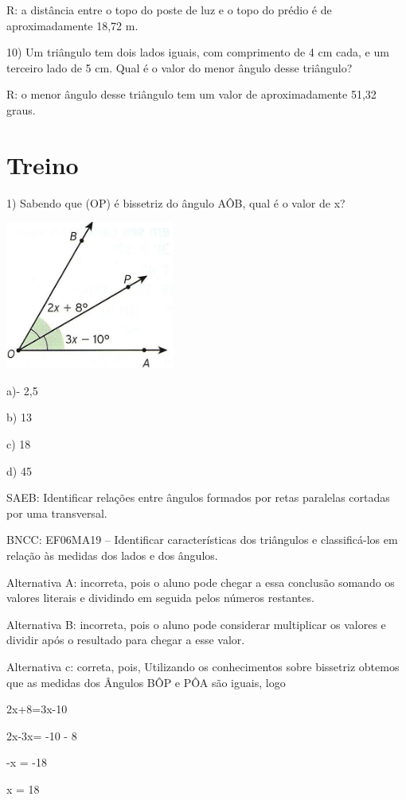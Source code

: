 R: a distância entre o topo do poste de luz e o topo do prédio é de
aproximadamente 18,72 m.

10) Um triângulo tem dois lados iguais, com comprimento de 4 cm cada, e
um terceiro lado de 5 cm. Qual é o valor do menor ângulo desse
triângulo?

R: o menor ângulo desse triângulo tem um valor de aproximadamente 51,32
graus.

\section{Treino}

1) Sabendo que (OP) é bissetriz do ângulo AÔB, qual é o valor de x?

\includegraphics[width=2.17708in,height=1.91619in]{./imgSAEB_6_MAT/media/image62.jpeg}

a)- 2,5

b) 13

c) 18

d) 45

SAEB: Identificar relações entre ângulos formados por retas paralelas
cortadas por uma transversal.

BNCC: EF06MA19 -- Identificar características dos triângulos e
classificá-los em relação às medidas dos lados e dos ângulos.

Alternativa A: incorreta, pois o aluno pode chegar a essa conclusão
somando os valores literais e dividindo em seguida pelos números
restantes.

Alternativa B: incorreta, pois o aluno pode considerar multiplicar os
valores e dividir após o resultado para chegar a esse valor.

Alternativa c: correta, pois, Utilizando os conhecimentos sobre
bissetriz obtemos que as medidas dos Ângulos BÔP e PÔA são iguais, logo

2x+8=3x-10

2x-3x= -10 - 8

-x = -18

x = 18

